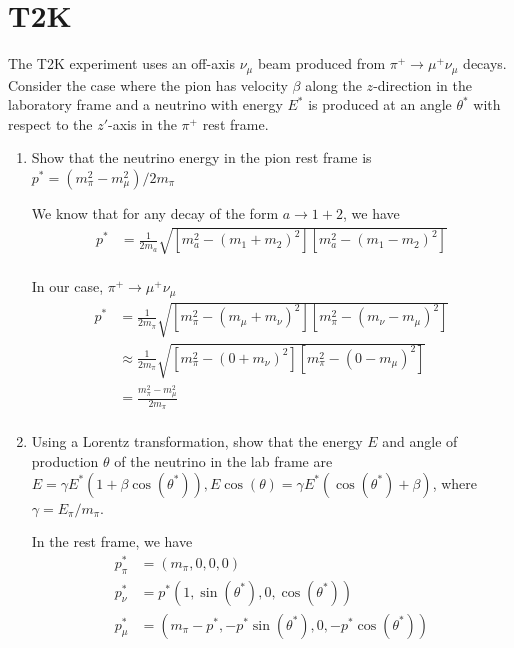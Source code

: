 \section{T2K}

The T2K experiment uses an off-axis $\nu_\mu$ beam produced from $\pi^+ \to \mu^+ \nu_\mu$ decays. Consider the case where the pion has velocity $\beta$ along the $z$-direction in the laboratory frame and a neutrino with energy $E^*$ is produced at an angle $\theta^*$ with respect to the $z'$-axis in the $\pi^+$ rest frame.

\begin{enumerate}[label=\textbf{\alph*}.]
    \item Show that the neutrino energy in the pion rest frame is $p^* = (m_\pi^2 - m_\mu^2) / 2m_\pi$

    We know that for any decay of the form $a \to 1 + 2$, we have
    \begin{align*}
      p^* &= \frac{1}{2m_a}\sqrt{\left[m_a^2 - (m_1+m_2)^2\right]\left[m_a^2 - (m_1-m_2)^2\right]} \\
    \end{align*}

    In our case, $\pi^+ \to \mu^+ \nu_\mu$
    \begin{align*}
      p^* &= \frac{1}{2m_\pi}\sqrt{\left[m_\pi^2 - (m_\mu+m_\nu)^2\right]\left[m_\pi^2 - (m_\nu-m_\mu)^2\right]} \\
      &\approx \frac{1}{2m_\pi}\sqrt{\left[m_\pi^2 - (0+m_\nu)^2\right]\left[m_\pi^2 - (0-m_\mu)^2\right]} \\
      &= \frac{m_\pi^2 - m_\mu^2}{2m_\pi} \\
    \end{align*}

    \item Using a Lorentz transformation, show that the energy $E$ and angle of production $\theta$ of the neutrino in the lab frame are $E = \gamma E^*(1 + \beta \cos(\theta^*)), E\cos(\theta) = \gamma E^*(\cos(\theta^*) + \beta)$, where $\gamma = E_\pi/m_\pi$.

    In the rest frame, we have
    \begin{align*}
        p_\pi^* &= (m_\pi, 0, 0, 0) \\
        p_\nu^* &= p^*(1, \sin(\theta^*), 0, \cos(\theta^*)) \\
        p_\mu^* &= (m_\pi-p^*, -p^*\sin(\theta^*), 0, -p^*\cos(\theta^*)) \\
    \end{align*}


\end{enumerate}
